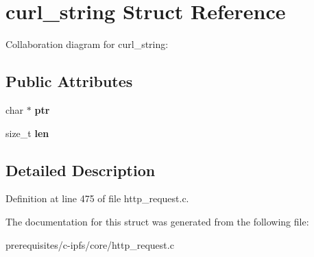 \hypertarget{structcurl__string}{}\section{curl\+\_\+string Struct Reference}
\label{structcurl__string}


Collaboration diagram for curl\+\_\+string\+:
\subsection*{Public Attributes}
\begin{DoxyCompactItemize}
\item 
\mbox{\label{structcurl__string_aba5b7f1341328e9c3f7b889e745ed5f9}} 
char $\ast$ {\bfseries ptr}
\item 
\mbox{\label{structcurl__string_adbffeb986897f37905b929e422204408}} 
size\+\_\+t {\bfseries len}
\end{DoxyCompactItemize}


\subsection{Detailed Description}


Definition at line 475 of file http\+\_\+request.\+c.



The documentation for this struct was generated from the following file\+:\begin{DoxyCompactItemize}
\item 
prerequisites/c-\/ipfs/core/http\+\_\+request.\+c\end{DoxyCompactItemize}
